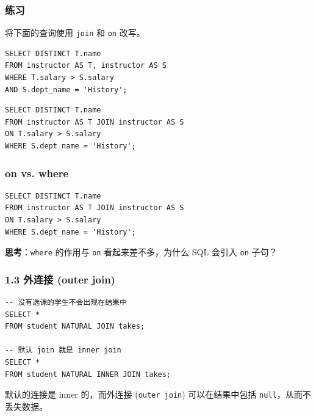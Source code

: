 \documentclass[aspectratio=169, 14pt]{beamer}
\begin{document}
\begin{frame}[fragile]
	\frametitle{练习}

	{\large {}} 将下面的查询使用 \texttt{join} 和 \texttt{on} 改写。

	\begin{verbatim}
SELECT DISTINCT T.name
FROM instructor AS T, instructor AS S
WHERE T.salary > S.salary
AND S.dept_name = 'History';    
\end{verbatim}

	\pause

	\begin{verbatim}
SELECT DISTINCT T.name
FROM instructor AS T JOIN instructor AS S
ON T.salary > S.salary
WHERE S.dept_name = 'History';   
\end{verbatim}

\end{frame}

\begin{frame}[fragile]
	\frametitle{on vs. where}

	\begin{verbatim}
SELECT DISTINCT T.name
FROM instructor AS T JOIN instructor AS S
ON T.salary > S.salary
WHERE S.dept_name = 'History';   
    \end{verbatim}

	{\large {}}  \textbf{思考}：\texttt{where} 的作用与 \texttt{on} 看起来差不多，为什么 SQL 会引入 \texttt{on} 子句？

	\pause

\end{frame}

\begin{frame}[fragile]
	\frametitle{1.3 外连接 (outer join)}
	\begin{verbatim}
-- 没有选课的学生不会出现在结果中
SELECT *
FROM student NATURAL JOIN takes;

-- 默认 join 就是 inner join
SELECT *
FROM student NATURAL INNER JOIN takes;
    \end{verbatim}

	默认的连接是 \alert{inner} 的，而外连接 (\texttt{outer join}) 可以在结果中包括 \texttt{null}，从而不丢失数据。

\end{frame}
\end{document}
